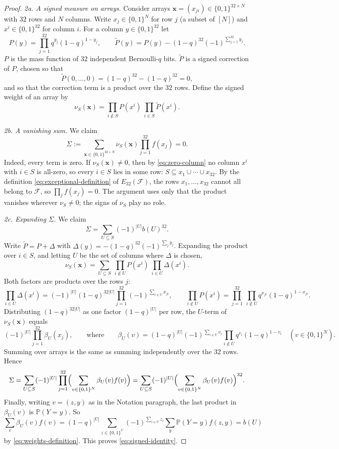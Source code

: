\documentclass[11pt,letterpaper]{article}
\theoremstyle{definition}
\theoremstyle{remark}
\numberwithin{equation}{section}
\begin{document}
\begin{proof}
\emph{2a. A signed measure on arrays.}
Consider arrays $\mathbf x=(x_{ji})\in\{0,1\}^{32\times N}$ with $32$ rows
and $N$ columns. Write $x_j\in\{0,1\}^N$ for row $j$ (a subset of $[N]$)
and $x^i\in\{0,1\}^{32}$ for column $i$. For a column
$y\in\{0,1\}^{32}$ let
\[
 P(y)=\prod_{j=1}^{32}q^{y_j}(1-q)^{1-y_j},
 \qquad
 \widetilde P(y)=P(y)-(1-q)^{32}(-1)^{\sum_{j=1}^{32}y_j}.
\]
$P$ is the mass function of $32$ independent Bernoulli-$q$ bits.
$\widetilde P$ is a signed correction of $P$, chosen so that
\begin{equation}\label{eq:zero-column}
\widetilde P(0,\ldots,0)=(1-q)^{32}-(1-q)^{32}=0,
\end{equation}
and so that the correction term is a product over the $32$ rows.
Define the signed weight of an array by
\[
\nu_S(\mathbf x)=\prod_{i\notin S}P(x^i)\ \prod_{i\in S}\widetilde P(x^i).
\]

\emph{2b. A vanishing sum.} We claim
\begin{equation}\label{eq:vanishing}
 \Sigma:=\sum_{\mathbf x\in\{0,1\}^{32\times N}}\nu_S(\mathbf x)
 \prod_{j=1}^{32}f(x_j)=0 .
\end{equation}
Indeed, every term is zero. If $\nu_S(\mathbf x)\ne0$, then by
\eqref{eq:zero-column} no column $x^i$ with $i\in S$ is all-zero, so every
$i\in S$ lies in some row: $S\subseteq x_1\cup\cdots\cup x_{32}$. By the
definition \eqref{eq:exceptional-definition} of $E_{32}(\mathcal F)$, the
rows $x_1,\ldots,x_{32}$ cannot all belong to $\mathcal F$, so
$\prod_jf(x_j)=0$. The argument uses only that the product vanishes
wherever $\nu_S\ne0$; the signs of $\nu_S$ play no role.

\emph{2c. Expanding $\Sigma$.} We claim
\begin{equation}\label{eq:signed-identity}
 \Sigma=\sum_{U\subseteq S}(-1)^{|U|}b(U)^{32}.
\end{equation}
Write $\widetilde P=P+\Delta$ with
$\Delta(y)=-(1-q)^{32}(-1)^{\sum_jy_j}$. Expanding the product over
$i\in S$, and letting $U$ be the set of columns where $\Delta$ is chosen,
\[
\nu_S(\mathbf x)=\sum_{U\subseteq S}\ \prod_{i\notin U}P(x^i)\ \prod_{i\in U}\Delta(x^i).
\]
Both factors are products over the rows $j$:
\[
\prod_{i\in U}\Delta(x^i)
=(-1)^{|U|}(1-q)^{32|U|}\prod_{j=1}^{32}(-1)^{\sum_{i\in U}x_{ji}},
\qquad
\prod_{i\notin U}P(x^i)
=\prod_{j=1}^{32}\ \prod_{i\notin U}q^{x_{ji}}(1-q)^{1-x_{ji}} .
\]
Distributing $(1-q)^{32|U|}$ as one factor $(1-q)^{|U|}$ per row, the
$U$-term of $\nu_S(\mathbf x)$ equals
\[
(-1)^{|U|}\prod_{j=1}^{32}\beta_U(x_j),
\qquad\text{where}\qquad
\beta_U(v)=(1-q)^{|U|}(-1)^{\sum_{i\in U}v_i}
\prod_{i\notin U}q^{v_i}(1-q)^{1-v_i}\quad(v\in\{0,1\}^N).
\]
Summing over arrays is the same as summing independently over the $32$
rows. Hence
\[
\Sigma=\sum_{U\subseteq S}(-1)^{|U|}\prod_{j=1}^{32}
\Bigl(\sum_{v\in\{0,1\}^N}\beta_U(v)f(v)\Bigr)
=\sum_{U\subseteq S}(-1)^{|U|}
\Bigl(\sum_{v\in\{0,1\}^N}\beta_U(v)f(v)\Bigr)^{32}.
\]
Finally, writing $v=(z,y)$ as in the Notation paragraph, the last product
in $\beta_U(v)$ is $\mathbb P(Y=y)$. So
\[
\sum_{v}\beta_U(v)f(v)
=(1-q)^{|U|}\sum_{z\in\{0,1\}^U}(-1)^{\sum_{i\in U}z_i}
\sum_{y}\mathbb P(Y=y)f(z,y)=b(U)
\]
by \eqref{eq:weights-definition}. This proves \eqref{eq:signed-identity}.


\end{proof}
\end{document}

